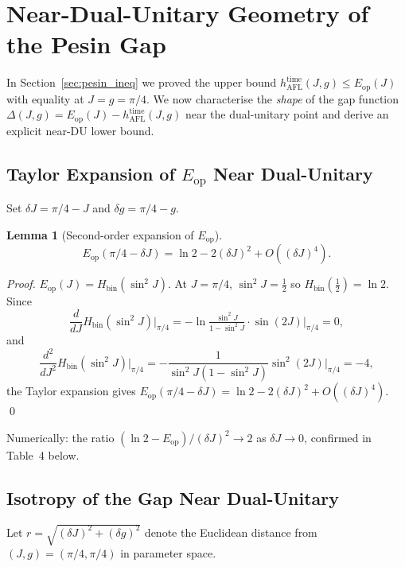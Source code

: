 \documentclass[12pt,a4paper]{article}
\newtheorem{lemma}[theorem]{Lemma}
\begin{document}
\section{Near-Dual-Unitary Geometry of the Pesin Gap}
\label{sec:near_du}

In Section~\ref{sec:pesin_ineq} we proved the upper bound
$h_\mathrm{AFL}^\mathrm{time}(J,g)\le E_\mathrm{op}(J)$ with equality at
$J=g=\pi/4$.  We now characterise the \emph{shape} of the gap function
$\Delta(J,g)=E_\mathrm{op}(J)-h_\mathrm{AFL}^\mathrm{time}(J,g)$ near the
dual-unitary point and derive an explicit near-DU lower bound.

\subsection{Taylor Expansion of $E_\mathrm{op}$ Near Dual-Unitary}

Set $\delta J = \pi/4 - J$ and $\delta g = \pi/4 - g$.

\begin{lemma}[Second-order expansion of $E_\mathrm{op}$]\label{lem:eop_expand}
\begin{equation}
  E_\mathrm{op}(\pi/4-\delta J)
  = \ln 2 - 2(\delta J)^2 + O((\delta J)^4).
\end{equation}
\end{lemma}

\begin{proof}
$E_\mathrm{op}(J)=H_\mathrm{bin}(\sin^2 J)$.  At $J=\pi/4$, $\sin^2 J=\tfrac{1}{2}$
so $H_\mathrm{bin}(\tfrac{1}{2})=\ln 2$.  Since
\[
  \frac{d}{dJ}H_\mathrm{bin}(\sin^2 J)\Big|_{\pi/4}
  = -\ln\!\tfrac{\sin^2 J}{1-\sin^2 J}\cdot\sin(2J)\Big|_{\pi/4} = 0,
\]
and
\[
  \frac{d^2}{dJ^2}H_\mathrm{bin}(\sin^2 J)\Big|_{\pi/4}
  = -\frac{1}{\sin^2 J(1-\sin^2 J)}\sin^2(2J)\Big|_{\pi/4} = -4,
\]
the Taylor expansion gives $E_\mathrm{op}(\pi/4-\delta J)=\ln 2 - 2(\delta J)^2+O((\delta J)^4)$.
\qed
\end{proof}

\noindent Numerically: the ratio $(\ln 2-E_\mathrm{op})/(\delta J)^2 \to 2$ as $\delta J\to 0$,
confirmed in Table~4 below.

\subsection{Isotropy of the Gap Near Dual-Unitary}

Let $r = \sqrt{(\delta J)^2+(\delta g)^2}$ denote the Euclidean distance from
$(J,g)=(\pi/4,\pi/4)$ in parameter space.
\end{document}
